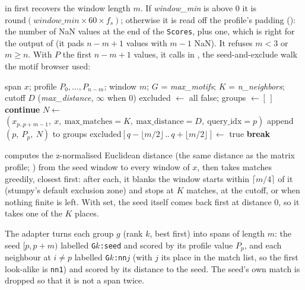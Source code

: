  in  first recovers the window length $m$. If
\emph{window\_min} is above 0 it is $\mathrm{round}(\textit{window\_min}\times 60\times f_s)$;
otherwise it is read off the profile's padding (): the number of NaN
values at the end of the \texttt{Scores}, plus one, which is right for the output of
 (it pads $n-m+1$ values with $m-1$ NaN). It refuses $m < 3$ or
$m \geq n$. With $P$ the first $n-m+1$ values, it calls  in
, the seed-and-exclude walk the motif
browser used:

\begin{algorithm}[H]
\caption{Motif groups (build\_motif\_groups)}
\begin{algorithmic}[1]
\Require span $x$; profile $P_0,\dots,P_{n-m}$; window $m$; $G$ = \emph{max\_motifs};
  $K$ = \emph{n\_neighbors}; cutoff $D$ (\emph{max\_distance}, $\infty$ when 0)
\State excluded $\gets$ all false; groups $\gets [\,]$
   \textbf{continue} \EndIf
  \State $N \gets$ $(x_{p..p+m-1},\ x,\ \text{max\_matches}=K,\ \text{max\_distance}=D,\ \text{query\_idx}=p)$
  \State append $(p,\ P_p,\ N)$ to groups
   \State excluded$[q - \lfloor m/2\rfloor \,..\, q + \lfloor m/2\rfloor] \gets$ true \EndFor
   \textbf{break} \EndIf
\EndFor
\end{algorithmic}
\end{algorithm}

 computes the z-normalised Euclidean distance (the same distance as the matrix
profile; ) from the seed window to every window of $x$, then
takes matches greedily, closest first: after each, it blanks the window starts within
$\lceil m/4\rceil$ of it (stumpy's default exclusion zone) and stops at $K$ matches, at the cutoff,
or when nothing finite is left. With  set, the seed itself comes back first at
distance 0, so it takes one of the $K$ places.

The adapter turns each group $g$ (rank $k$, best first) into spans of length $m$: the seed
$[p, p+m)$ labelled \texttt{G$k$:seed} and scored by its profile value $P_p$, and each neighbour at
$i \neq p$ labelled \texttt{G$k$:nn$j$} (with $j$ its place in the match list, so the first
look-alike is \texttt{nn1}) and scored by its distance to the seed. The seed's own match is
dropped so that it is not a span twice.

